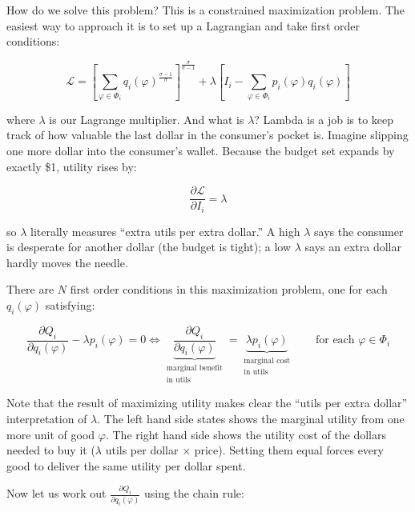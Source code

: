 \documentclass[11pt,letterpaper]{article}
\begin{document}
How do we solve this problem? This is a constrained maximization problem. The easiest way to approach it is to set up a Lagrangian and take first order conditions:

\begin{equation*}
    \mathcal{L} = \left[ \sum_{\varphi \in \Phi_i } q_i(
\varphi)^{\tfrac{\sigma-1}{\sigma}} \right]^{\tfrac{\sigma}{\sigma-1} } + \lambda \left[ I_i - \sum_{\varphi \in \Phi_i } p_i(\varphi) q_i(\varphi) \right]
\end{equation*}

\noindent where $\lambda$ is our Lagrange multiplier. And what is $\lambda$? Lambda is a job is to keep track of how valuable the last dollar in the consumer’s pocket is. Imagine slipping one more dollar into the consumer’s wallet. Because the budget set expands by exactly \$1, utility rises by:

\begin{equation*}
    \frac{\partial \mathcal{L}}{\partial I_i} = \lambda
\end{equation*}


\noindent so $\lambda$ literally measures ``extra utils per extra dollar.'' A high 
$\lambda$ says the consumer is desperate for another dollar (the budget is tight); a low 
$\lambda$ says an extra dollar hardly moves
the needle.

There are $N$ first order conditions in this maximization problem, one for each $q_{i}(\varphi)$ satisfying:

\begin{equation*}
    \frac{\partial Q_i}{\partial q_{i}(\varphi)} - \lambda p_i(\varphi) =0 \iff \underbrace{\frac{\partial Q_i}{\partial q_{i}(\varphi)}}_{\substack{\text{marginal benefit} \\ \text{in utils}}} = \underbrace{\lambda p_i(\varphi)}_{\substack{\text{marginal cost} \\ \text{in utils}}} \qquad \text{for each } \varphi \in \Phi_i
\end{equation*}

Note that the result of maximizing utility makes clear the ``utils per extra dollar'' interpretation of $\lambda$. The left hand side states shows the marginal utility from one more unit of good $\varphi$. The right hand side shows the utility cost of the dollars needed to buy it ($\lambda$ utils per dollar $\times$ price). Setting them equal forces every good to deliver the same utility per dollar spent.

Now let us work out $\frac{\partial Q_i}{\partial q_{i}(\varphi)}$ using the chain rule:
\end{document}
